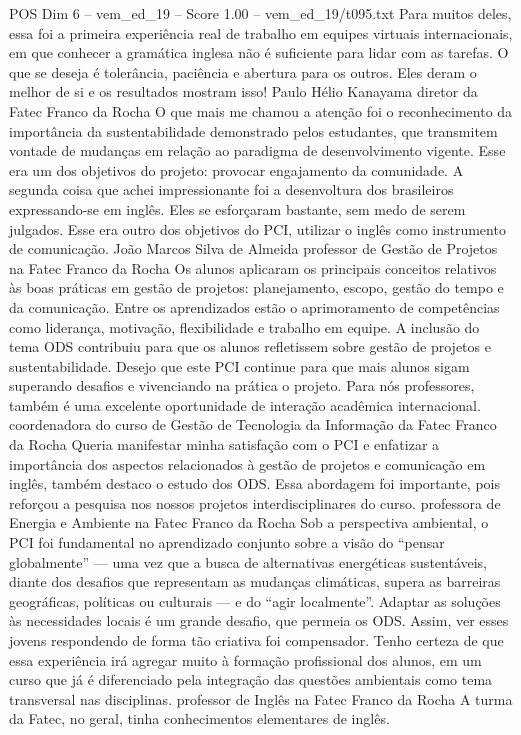 \begin{textsample}{POS Dim 6 – vem\_ed\_19 – Score 1.00 – vem\_ed\_19/t095.txt}
Para muitos deles, essa foi a primeira experiência real de trabalho em equipes virtuais internacionais, em que conhecer a gramática inglesa não é suficiente para lidar com as tarefas.
O que se deseja é tolerância, paciência e abertura para os outros.
Eles deram o melhor de si e os resultados mostram isso!
Paulo Hélio Kanayama diretor da Fatec Franco da Rocha O que mais me chamou a atenção foi o reconhecimento da importância da sustentabilidade demonstrado pelos estudantes, que transmitem vontade de mudanças em relação ao paradigma de desenvolvimento vigente.
Esse era um dos objetivos do projeto: provocar engajamento da comunidade.
A segunda coisa que achei impressionante foi a desenvoltura dos brasileiros expressando-se em inglês.
Eles se esforçaram bastante, sem medo de serem julgados.
Esse era outro dos objetivos do PCI, utilizar o inglês como instrumento de comunicação.
João Marcos Silva de Almeida professor de Gestão de Projetos na Fatec Franco da Rocha Os alunos aplicaram os principais conceitos relativos às boas práticas em gestão de projetos: planejamento, escopo, gestão do tempo e da comunicação.
Entre os aprendizados estão o aprimoramento de competências como liderança, motivação, flexibilidade e trabalho em equipe.
A inclusão do tema ODS contribuiu para que os alunos refletissem sobre gestão de projetos e sustentabilidade.
Desejo que este PCI continue para que mais alunos sigam superando desafios e vivenciando na prática o projeto.
Para nós professores, também é uma excelente oportunidade de interação acadêmica internacional. coordenadora do curso de Gestão de Tecnologia da Informação da Fatec Franco da Rocha Queria manifestar minha satisfação com o PCI e enfatizar a importância dos aspectos relacionados à gestão de projetos e comunicação em inglês, também destaco o estudo dos ODS.
Essa abordagem foi importante, pois reforçou a pesquisa nos nossos projetos interdisciplinares do curso. professora de Energia e Ambiente na Fatec Franco da Rocha Sob a perspectiva ambiental, o PCI foi fundamental no aprendizado conjunto sobre a visão do “pensar globalmente” — uma vez que a busca de alternativas energéticas sustentáveis, diante dos desafios que representam as mudanças climáticas, supera as barreiras geográficas, políticas ou culturais — e do “agir localmente”.
Adaptar as soluções às necessidades locais é um grande desafio, que permeia os ODS.
Assim, ver esses jovens respondendo de forma tão criativa foi compensador.
Tenho certeza de que essa experiência irá agregar muito à formação profissional dos alunos, em um curso que já é diferenciado pela integração das questões ambientais como tema transversal nas disciplinas. professor de Inglês na Fatec Franco da Rocha A turma da Fatec, no geral, tinha conhecimentos elementares de inglês.

\end{textsample}
